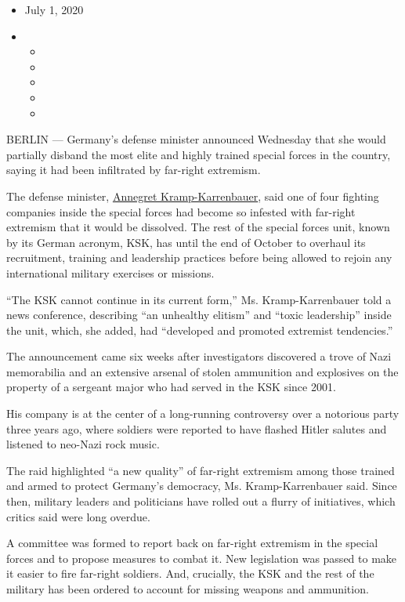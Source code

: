 \begin{itemize}
\item
  July 1, 2020
\item
  \begin{itemize}
  \item
  \item
  \item
  \item
  \item
  \end{itemize}
\end{itemize}

BERLIN --- Germany's defense minister announced Wednesday that she would
partially disband the most elite and highly trained special forces in
the country, saying it had been infiltrated by far-right extremism.

The defense minister,
\href{https://www.nytimes.com/2020/02/10/world/europe/annegret-kramp-karrenbauer-resign.html?searchResultPosition=25}{Annegret
Kramp-Karrenbauer}, said one of four fighting companies inside the
special forces had become so infested with far-right extremism that it
would be dissolved. The rest of the special forces unit, known by its
German acronym, KSK, has until the end of October to overhaul its
recruitment, training and leadership practices before being allowed to
rejoin any international military exercises or missions.

``The KSK cannot continue in its current form,'' Ms. Kramp-Karrenbauer
told a news conference, describing ``an unhealthy elitism'' and ``toxic
leadership'' inside the unit, which, she added, had ``developed and
promoted extremist tendencies.''

The announcement came six weeks after investigators discovered a trove
of Nazi memorabilia and an extensive arsenal of stolen ammunition and
explosives on the property of a sergeant major who had served in the KSK
since 2001.

His company is at the center of a long-running controversy over a
notorious party three years ago, where soldiers were reported to have
flashed Hitler salutes and listened to neo-Nazi rock music.

The raid highlighted ``a new quality'' of far-right extremism among
those trained and armed to protect Germany's democracy, Ms.
Kramp-Karrenbauer said. Since then, military leaders and politicians
have rolled out a flurry of initiatives, which critics said were long
overdue.

A committee was formed to report back on far-right extremism in the
special forces and to propose measures to combat it. New legislation was
passed to make it easier to fire far-right soldiers. And, crucially, the
KSK and the rest of the military has been ordered to account for missing
weapons and ammunition.


